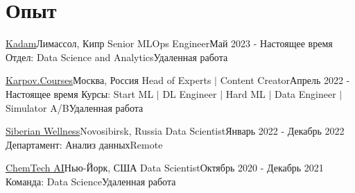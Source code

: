 \section{Опыт}
\resumeSubHeadingListStart

\resumeSubheadingWork
{\href{https://www.kadam.net/}{Kadam}}{Лимассол, Кипр}
{Senior MLOps Engineer}{Май 2023 - Настоящее время}
{Отдел: Data Science and Analytics}{Удаленная работа}
\resumeItemListStart
{}
\resumeItemListEnd

\resumeSubheadingWork
{\href{https://www.karpov.courses/}{Karpov.Courses}}{Москва, Россия}
{Head of Experts $|$ Content Creator}{Апрель 2022 - Настоящее время}
{Курсы: Start ML $|$ DL Engineer $|$ Hard ML $|$ Data Engineer $|$ Simulator A/B}{Удаленная работа}
\resumeItemListStart
{}
\resumeItemListEnd

\resumeSubheadingWork
{\href{https://siberianhealth.com/ru}{Siberian Wellness}}{Novosibirsk, Russia}
{Data Scientist}{Январь 2022 - Декабрь 2022}
{Департамент: Анализ данных}{Remote}
\resumeItemListStart
{}
\resumeItemListEnd

\resumeSubheadingWork
{\href{https://www.chmtch.com/}{ChemTech AI}}{Нью-Йорк, США}
{Data Scientist}{Октябрь 2020 - Декабрь 2021}
{Команда: Data Science}{Удаленная работа}
\resumeItemListStart
{}
\resumeItemListEnd

\resumeSubHeadingListEnd
